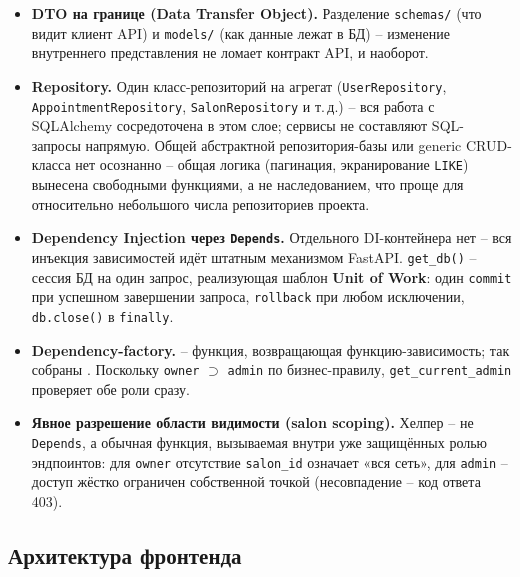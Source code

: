 \begin{itemize}
  \item \textbf{DTO на границе (Data Transfer Object).} Разделение
        \texttt{schemas/} (что видит клиент API) и \texttt{models/} (как
        данные лежат в БД) -- изменение внутреннего представления не ломает
        контракт API, и наоборот.
  \item \textbf{Repository.} Один класс-репозиторий на агрегат (\texttt{UserRepository},
        \texttt{AppointmentRepository}, \texttt{SalonRepository} и т.\,д.) --
        вся работа с SQLAlchemy сосредоточена в этом слое; сервисы не
        составляют SQL-запросы напрямую. Общей абстрактной
        репозитория-базы или generic CRUD-класса нет осознанно -- общая
        логика (пагинация, экранирование \texttt{LIKE}) вынесена
        свободными функциями, а не наследованием, что проще для
        относительно небольшого числа репозиториев проекта.
  \item \textbf{Dependency Injection через \texttt{Depends}.} Отдельного
        DI-контейнера нет -- вся инъекция зависимостей идёт штатным
        механизмом FastAPI. \texttt{get\_db()} -- сессия БД на один
        запрос, реализующая шаблон \textbf{Unit of Work}: один
        \texttt{commit} при успешном завершении запроса, \texttt{rollback}
        при любом исключении, \texttt{db.close()} в \texttt{finally}.
  \item \textbf{Dependency-factory.}  --
        функция, возвращающая функцию-зависимость; так собраны
        . Поскольку
        \texttt{owner} $\supset$ \texttt{admin} по бизнес-правилу,
        \texttt{get\_current\_admin} проверяет обе роли сразу.
  \item \textbf{Явное разрешение области видимости (salon scoping).}
        Хелпер 
        -- не \texttt{Depends}, а обычная функция, вызываемая внутри уже
        защищённых ролью эндпоинтов: для \texttt{owner} отсутствие
        \texttt{salon\_id} означает «вся сеть», для \texttt{admin} --
        доступ жёстко ограничен собственной точкой (несовпадение --
        код ответа 403).
\end{itemize}

\subsection{Архитектура фронтенда}

